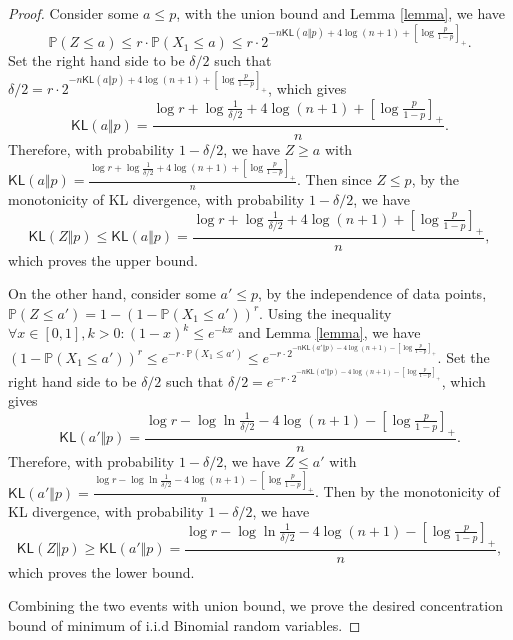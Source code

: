 \documentclass[12pt]{article}
\newcommand{\KL}{\textsf{KL}}
\begin{document}
\begin{proof}
    Consider some $a \leq p$, with the union bound and Lemma \ref{lemma}, we have 
    \[
    \mathbb{P}(Z \leq a) \leq r \cdot\mathbb{P}(X_1 \leq a) \leq r \cdot 2^{-n\KL(a\Vert p) + 4\log (n+1) + \left[ \log \frac{p}{1-p} \right]_+}.
    \]
    Set the right hand side to be $\delta/2$ such that $\delta/2 = r \cdot 2^{-n\KL(a\Vert p) + 4\log (n+1) + \left[ \log \frac{p}{1-p} \right]_+}$, which gives
    \[
    \KL(a\Vert p) = \frac{\log r + \log \frac{1}{\delta/2} + 4\log (n+1) + \left[ \log \frac{p}{1-p} \right]_+}{n}.
    \]
    Therefore, with probability $1-\delta/2$, we have $Z \geq a$ with $\KL(a\Vert p) = \frac{\log r + \log \frac{1}{\delta/2} + 4\log (n+1) +\left[ \log \frac{p}{1-p} \right]_+}{n}$. Then since $Z \leq p$, by the monotonicity of KL divergence, with probability $1-\delta/2$, we have 
    \begin{equation}
      \KL(Z\Vert p) \leq \KL(a\Vert p) = \frac{\log r + \log \frac{1}{\delta/2} + 4\log (n+1) + \left[ \log \frac{p}{1-p} \right]_+}{n}, 
    \end{equation}
    which proves the upper bound.

    On the other hand, consider some $a' \leq p$, by the independence of data points, $\mathbb{P}(Z \leq a') = 1 -(1-\mathbb{P}(X_1 \leq a'))^r$. Using the inequality $\forall x \in [0,1], k > 0: (1-x)^k \leq e^{-kx}$ and Lemma \ref{lemma}, we have $(1-\mathbb{P}(X_1 \leq a'))^r \leq e^{-r \cdot \mathbb{P}(X_1 \leq a')} \leq e^{-r \cdot 2^{-n\KL(a'\Vert p) - 4\log (n+1) - \left[ \log \frac{p}{1-p} \right]_+}}$. Set the right hand side to be $\delta/2$ such that $\delta/2 = e^{-r \cdot 2^{-n\KL(a'\Vert p) - 4\log (n+1) - \left[ \log \frac{p}{1-p} \right]_+}}$, which gives
    \[
    \KL(a'\Vert p) = \frac{\log r - \log \ln \frac{1}{\delta/2} - 4\log (n+1) - \left[ \log \frac{p}{1-p} \right]_+}{n}.
    \]
    Therefore, with probability $1-\delta/2$, we have $Z \leq a'$ with $\KL(a'\Vert p) = \frac{\log r - \log \ln \frac{1}{\delta/2} - 4\log (n+1) - \left[ \log \frac{p}{1-p} \right]_+}{n}$. Then by the monotonicity of KL divergence, with probability $1-\delta/2$, we have
    \begin{equation}
        \KL(Z\Vert p) \geq \KL(a'\Vert p) = \frac{\log r - \log \ln \frac{1}{\delta/2} - 4\log (n+1) - \left[ \log \frac{p}{1-p} \right]_+}{n},
    \end{equation}
    which proves the lower bound.

    Combining the two events with union bound, we prove the desired concentration bound of minimum of i.i.d Binomial random variables. 
\end{proof}
\fi
\end{document}
